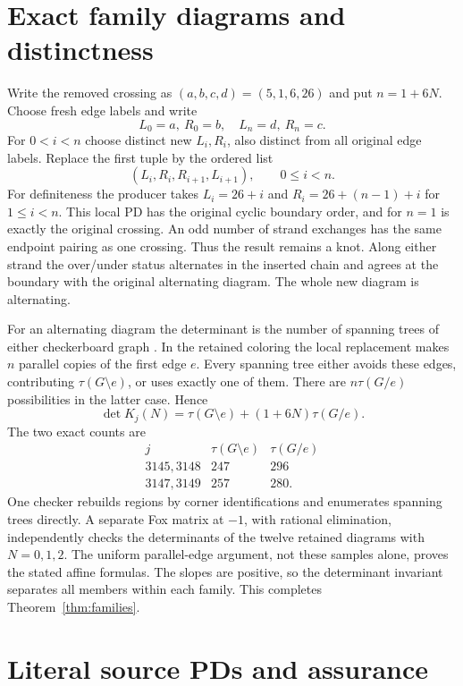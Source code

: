 \documentclass[11pt]{article}
\begin{document}
\section{Exact family diagrams and distinctness}\label{sec:pd}

Write the removed crossing as $(a,b,c,d)=(5,1,6,26)$ and
put $n=1+6N$. Choose fresh edge labels and write
\[
 L_0=a,\ R_0=b,\quad L_n=d,\ R_n=c.
\]
For $0<i<n$ choose distinct new $L_i,R_i$, also distinct
from all original edge labels. Replace the first tuple by
the ordered list
\[
                  (L_i,R_i,R_{i+1},L_{i+1}),\qquad 0\le i<n.
\]
For definiteness the producer takes $L_i=26+i$ and
$R_i=26+(n-1)+i$ for $1\le i<n$. This local PD has the
original cyclic boundary order, and for $n=1$ is exactly
the original crossing. An odd number of strand exchanges
has the same endpoint pairing as one crossing. Thus the
result remains a knot. Along either strand the over/under
status alternates in the inserted chain and agrees at the
boundary with the original alternating diagram. The whole
new diagram is alternating.

For an alternating diagram the determinant is the number
of spanning trees of either checkerboard graph
\cite[Lemma 3.14]{stoim}. In the retained coloring the local
replacement makes $n$ parallel copies of the first edge $e$.
Every spanning tree either avoids these edges, contributing
$\tau(G\setminus e)$, or uses exactly one of them. There are
$n\tau(G/e)$ possibilities in the latter case. Hence
\[
             \det K_j(N)=\tau(G\setminus e)+(1+6N)\tau(G/e).
\]
The two exact counts are
\[
\begin{array}{c|rr}
j&\tau(G\setminus e)&\tau(G/e)\\\hline
3145,3148&247&296\\
3147,3149&257&280.
\end{array}
\]
One checker rebuilds regions by corner identifications
and enumerates spanning trees directly. A separate Fox
matrix at $-1$, with rational elimination, independently
checks the determinants of the twelve retained diagrams
with $N=0,1,2$. The uniform parallel-edge argument, not
these samples alone, proves the stated affine formulas.
The slopes are positive, so the determinant invariant
separates all members within each family. This completes
Theorem~\ref{thm:families}.

\section{Literal source PDs and assurance}\label{sec:inputs}
\end{document}
